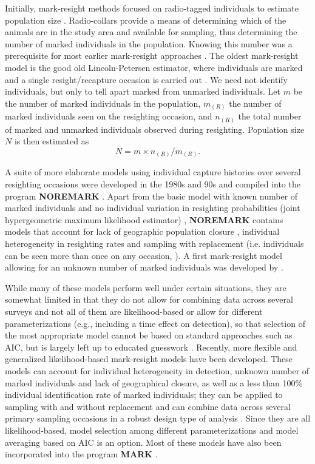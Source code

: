Initially, mark-resight methods focused on radio-tagged individuals to
estimate population size \citep{white_shenk:2001}. Radio-collars
provide a means of
determining
which of the animals are in the study
area and available for sampling, thus determining the number of marked
individuals in the population. Knowing this number was a prerequisite
for most earlier mark-resight approaches \citep{white:1996}. The
oldest mark-resight model is the good old Lincoln-Petersen estimator,
 where individuals are marked and a single resight/recapture occasion
 is carried out \citep{krebs:1999}. We need not identify individuals,
 but only to tell apart marked from unmarked individuals. Let $m$ be the
 number of marked individuals in the population, $m_{(R)}$ the number
 of marked individuals seen on the resighting occasion, and $n_{(R)}$
 the total number of marked and unmarked individuals observed during
 resighting. Population size $N$ is then estimated as
\[
N = m \times n_{(R)}/m_{(R)}.
\]

A suite of more elaborate models using individual capture histories
over several resighting occasions were developed in the 1980s and
90s and compiled into the program \textbf{NOREMARK} \citep{white:1996}. Apart
from the basic model with known number of marked individuals and no
individual variation in resighting probabilities (joint hypergeometric
maximum likelihood estimator) \citep{bartmann_etal:1987,
  white_garrot:1990, neal:1990, neal_etal:1993}, \textbf{NOREMARK} contains
models that account for lack of geographic population closure
\citep{neal_etal:1993}, individual heterogeneity in resighting rates
and sampling with replacement (i.e. individuals can be seen more than
once on any occasion, \citep{minta_mangel:1989, bowden:1993}). A first
mark-resight model allowing for an unknown number of marked
individuals was developed by \citet{arnason_etal:1991}.

While many of these models perform well under certain situations, they
are somewhat
limited in that they
do not allow for combining data across
several surveys \citep{mcclintock_etal:2006} and not all of them are
likelihood-based or allow for different parameterizations 
(e.g., including a time effect on detection), so that
selection of the most appropriate model cannot be based on standard
approaches such as AIC, but is largely left up to educated guesswork
\citep{mcclintock_etal:2006}. Recently, more flexible and generalized
likelihood-based mark-resight models have been developed. These models
can account for individual heterogeneity in detection, unknown number
of marked individuals and lack of geographical closure, as well as a
less than 100\% individual identification rate of marked individuals;
they can be applied to sampling with and without replacement and can
combine data across several primary sampling occasions in a robust
design type of analysis
\citep{mcclintock_etal:2009biometrics,mcclintock_etal:2009mdp}. Since
they are all likelihood-based, model selection among different
parameterizations and model averaging based on AIC is an option. Most
of these models have also been incorporated into the program {\bf MARK}
\citep{mcclintock_white:2010}.

